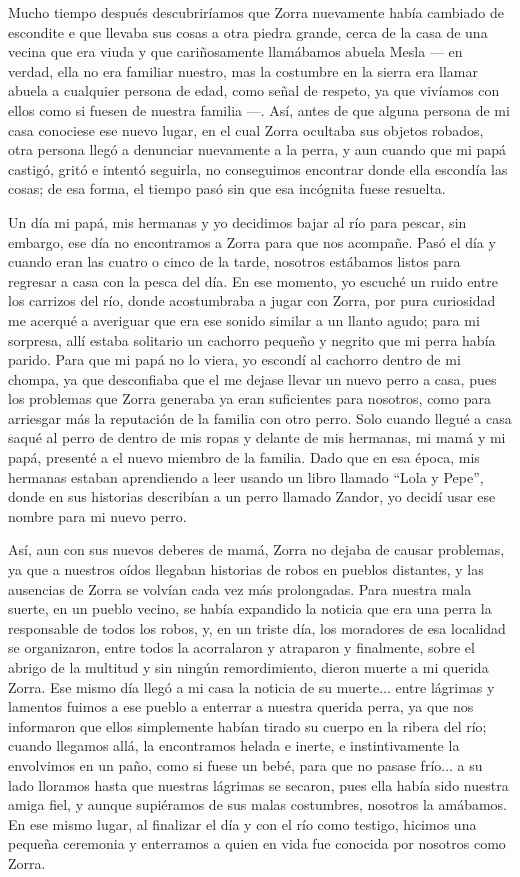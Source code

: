 Mucho tiempo después descubriríamos que Zorra nuevamente había cambiado de escondite e que llevaba sus cosas a otra piedra grande, cerca de la casa de una vecina que era viuda y que cariñosamente llamábamos abuela Mesla --- en verdad, ella no era familiar nuestro, mas la costumbre en la sierra era llamar abuela a cualquier persona de edad, como señal de respeto, ya que vivíamos con ellos como si fuesen de nuestra familia ---.
Así, antes de que alguna persona de mi casa conociese ese nuevo lugar, en el cual Zorra ocultaba sus objetos robados, otra persona llegó a denunciar nuevamente a la perra, y aun cuando que mi papá castigó, gritó e intentó seguirla, no conseguimos encontrar donde ella escondía las cosas; de esa forma, el tiempo pasó sin que esa incógnita fuese resuelta.

Un día mi papá, mis hermanas y yo decidimos bajar al río para pescar, sin embargo, ese día no encontramos a Zorra para que nos acompañe. Pasó el día y cuando eran las cuatro o cinco de la tarde, nosotros estábamos listos para regresar a casa con la pesca del día. En ese momento, yo escuché un ruido entre los carrizos del río, donde acostumbraba a jugar con Zorra, por pura curiosidad me acerqué a averiguar que era ese sonido similar a un llanto agudo; para mi sorpresa, allí estaba solitario un cachorro pequeño y negrito que mi perra había parido.
Para que mi papá no lo viera, yo escondí al cachorro dentro de mi chompa, ya que desconfiaba que el me dejase llevar un nuevo perro a casa, pues los problemas que Zorra generaba ya eran suficientes para nosotros, como para arriesgar más la reputación de la familia con otro perro.
Solo cuando llegué a casa saqué al perro de dentro de mis ropas y delante de mis hermanas, mi mamá y mi papá, presenté a el nuevo miembro de la familia. Dado que en esa época, mis hermanas estaban aprendiendo a leer usando un libro llamado ``Lola y Pepe'', donde en sus historias describían a un perro llamado Zandor, yo decidí usar ese nombre para mi nuevo perro.

Así, aun con sus nuevos deberes de mamá, Zorra no dejaba de causar problemas, ya que a nuestros oídos llegaban historias de robos en pueblos distantes, y las ausencias de Zorra se volvían cada vez más prolongadas.
Para nuestra mala suerte, en un pueblo vecino, se había expandido la noticia que era una perra la responsable de todos los robos, y, en un triste día, los moradores de esa localidad se organizaron, entre todos la acorralaron y atraparon y finalmente, sobre el abrigo de la multitud y sin ningún remordimiento, dieron muerte a mi querida Zorra. 
Ese mismo día llegó a mi casa la noticia de su muerte... entre lágrimas y lamentos fuimos a ese pueblo a enterrar a nuestra querida perra, ya que nos informaron que ellos simplemente habían tirado su cuerpo en la ribera del río; cuando llegamos allá, la encontramos helada e inerte, e instintivamente la envolvimos en un paño, como si fuese un bebé, para que no pasase frío... a su lado lloramos hasta que nuestras lágrimas se secaron, pues ella había sido nuestra amiga fiel, y aunque supiéramos de sus malas costumbres, nosotros la amábamos.
En ese mismo lugar, al finalizar el día y con el río como testigo, hicimos una pequeña ceremonia y enterramos a quien en vida fue conocida por nosotros como Zorra.

